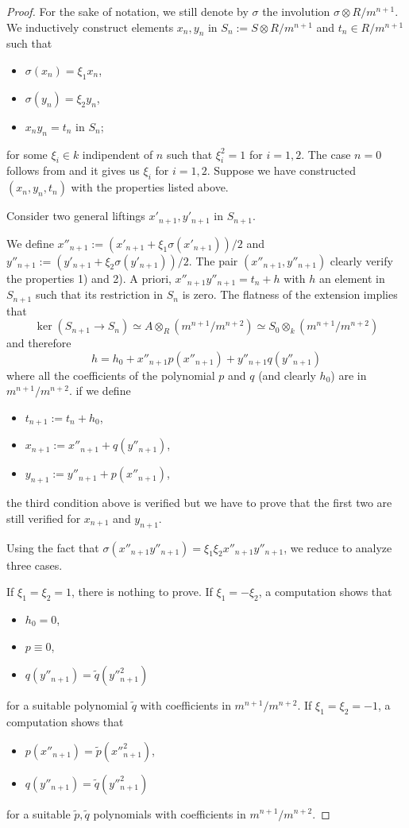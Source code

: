 \documentclass{alggeom}
\numberwithin{equation}{section}
\numberwithin{subsection}{section}
\theoremstyle{definition}
\theoremstyle{remark}
\begin{document}
 \begin{proof}
 For the sake of notation, we still denote by $\sigma$ the involution $\sigma \otimes R/m^{n+1}$. We inductively construct elements $x_n,y_n$ in $S_n:=S\otimes R/m^{n+1}$ and $t_n \in R/m^{n+1}$ such that 
 	\begin{itemize}
 		\item[1)] $\sigma(x_n)=\xi_1x_n$,
 		\item[2)] $\sigma(y_n)=\xi_2y_n$,
 		\item[3)] $x_ny_n=t_n$ in $S_n$;
 	\end{itemize}
 for some $\xi_i \in k$ indipendent of $n$ such that $\xi_i^2=1$ for $i=1,2$. The case $n=0$ follows from  and it gives us $\xi_i$ for $i=1,2$. Suppose we have constructed $(x_n,y_n,t_n)$ with the properties listed above. 

 Consider two general liftings $x'_{n+1},y'_{n+1}$ in $S_{n+1}$. 
 
 We define $x''_{n+1}:=(x'_{n+1}+\xi_1\sigma(x'_{n+1}))/2$ and $y''_{n+1}:=(y'_{n+1}+\xi_2\sigma(y'_{n+1}))/2$. The pair $(x''_{n+1},y''_{n+1})$ clearly verify the properties 1) and 2). A priori, $x''_{n+1}y''_{n+1}=t_n+h$ with $h$ an element in $S_{n+1}$ such that its restriction in $S_n$ is zero. The flatness of the extension implies that 
 $$ \ker(S_{n+1}\rightarrow S_n)\simeq A \otimes_R (m^{n+1}/m^{n+2})\simeq S_0 \otimes_k (m^{n+1}/m^{n+2})$$ and therefore $$ h = h_0 + x''_{n+1}p(x''_{n+1}) + y''_{n+1}q(y''_{n+1})$$ 
 where all the coefficients of the polynomial $p$ and $q$ (and clearly $h_0$) are in $m^{n+1}/m^{n+2}$. if we define 
 \begin{itemize}
 	\item $t_{n+1}:=t_n+h_0$,
 	\item $x_{n+1}:=x''_{n+1}+q(y''_{n+1})$,
 	\item $y_{n+1}:=y''_{n+1}+p(x''_{n+1})$,
 \end{itemize}  
 the third condition above is verified but we have to prove that the first two are still verified for $x_{n+1}$ and $y_{n+1}$. 

 Using the fact that $\sigma(x''_{n+1}y''_{n+1})=\xi_1\xi_2x''_{n+1}y''_{n+1}$, we reduce to analyze three cases.
 
 If $\xi_1=\xi_2=1$, there is nothing to prove.
 If $\xi_1=-\xi_2$, a computation shows that   
 \begin{itemize}
 	\item $h_0=0$,
 	\item $ p\equiv 0$,
 	\item $q(y''_{n+1})=\tilde{q}(y''^2_{n+1})$
 \end{itemize}
for a suitable polynomial $\tilde{q}$ with coefficients in $m^{n+1}/m^{n+2}$. 
 If $\xi_1=\xi_2=-1$, a computation shows that   
\begin{itemize}
	\item $ p(x''_{n+1})=\tilde{p}(x''^2_{n+1})$,
	\item $q(y''_{n+1})=\tilde{q}(y''^2_{n+1})$
\end{itemize}
for a suitable $\tilde{p},\tilde{q}$ polynomials with coefficients in $m^{n+1}/m^{n+2}$. 


\end{proof}
\end{document}
